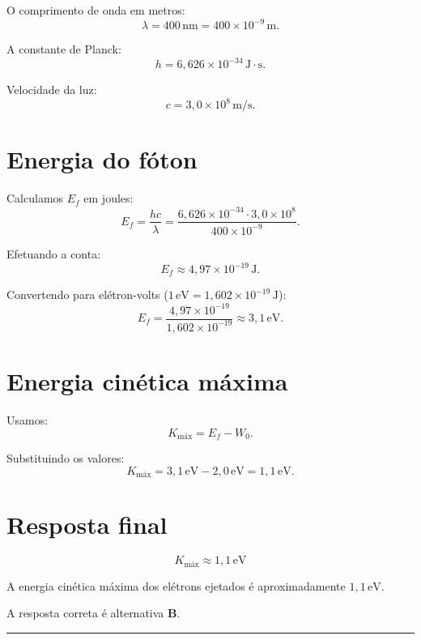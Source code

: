 \begin{flushleft}
O comprimento de onda em metros:
\[
\lambda = 400\,\mathrm{nm} = 400 \times 10^{-9}\,\mathrm{m}.
\]

A constante de Planck:
\[
h = 6{,}626 \times 10^{-34}\, \mathrm{J\cdot s}.
\]

Velocidade da luz:
\[
c = 3{,}0 \times 10^{8}\, \mathrm{m/s}.
\]

\section*{Energia do fóton}

Calculamos \(E_f\) em joules:
\[
E_f = \frac{hc}{\lambda} =
\frac{6{,}626 \times 10^{-34} \cdot 3{,}0 \times 10^{8}}{400 \times 10^{-9}}.
\]

Efetuando a conta:
\[
E_f \approx 4{,}97 \times 10^{-19}\, \mathrm{J}.
\]

Convertendo para elétron-volts (\(1\,\mathrm{eV} = 1{,}602 \times 10^{-19}\,\mathrm{J}\)):
\[
E_f = \frac{4{,}97 \times 10^{-19}}{1{,}602 \times 10^{-19}} \approx 3,1\,\mathrm{eV}.
\]

\section*{Energia cinética máxima}

Usamos:
\[
K_{\text{máx}} = E_f - W_0.
\]

Substituindo os valores:
\[
K_{\text{máx}} = 3{,}1\,\mathrm{eV} - 2{,}0\,\mathrm{eV} = 1{,}1\,\mathrm{eV}.
\]

\section*{Resposta final}

\[
\boxed{
K_{\text{máx}} \approx 1{,}1\,\mathrm{eV}
}
\]

A energia cinética máxima dos elétrons ejetados é aproximadamente \(1{,}1\,\mathrm{eV}\).

A resposta correta é alternativa \colorbox{green!50}{\textbf{B}}.
\end{flushleft}

\noindent\rule{\linewidth}{0.6pt}\\

